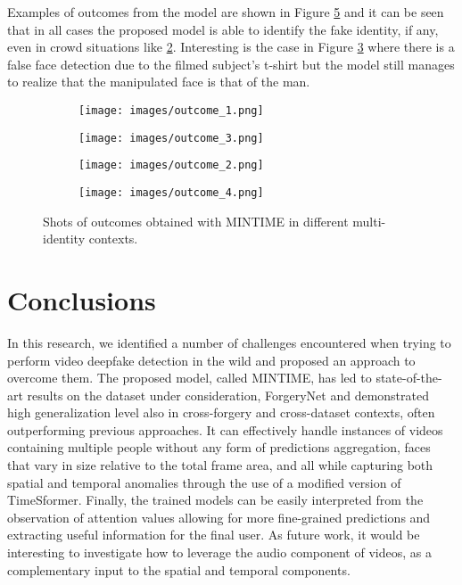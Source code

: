 \documentclass[10pt,twocolumn,letterpaper]{article}
\begin{document}
Examples of outcomes from the model are shown in Figure \ref{fig:outcome} and it can be seen that in all cases the proposed model is able to identify the fake identity, if any, even in crowd situations like \ref{fig:outcome_b}. Interesting is the case in Figure \ref{fig:outcome_c} where there is a false face detection due to the filmed subject's t-shirt but the model still manages to realize that the manipulated face is that of the man. 
\begin{figure}[t]
    \centering
    \begin{subfigure}{.45\linewidth}
    \texttt{[image: images/outcome\_1.png]}  \caption{}
    \label{fig:outcome_a}
    \end{subfigure}
    \begin{subfigure}{.45\linewidth}
    \texttt{[image: images/outcome\_3.png]}  \caption{}
    \label{fig:outcome_b}
    \end{subfigure}
    \begin{subfigure}{.45\linewidth}
    \texttt{[image: images/outcome\_2.png]}  \caption{}
    \label{fig:outcome_c}
    \end{subfigure}
    \begin{subfigure}{.45\linewidth}
    \texttt{[image: images/outcome\_4.png]}  \caption{}
    \label{fig:outcome_d}
    \end{subfigure}
    \caption{Shots of outcomes obtained with MINTIME in different multi-identity contexts.}
    \label{fig:outcome}
\end{figure}

\section{Conclusions}
In this research, we identified a number of challenges encountered when trying to perform video deepfake detection in the wild and proposed an approach to overcome them. The proposed model, called MINTIME, has led to state-of-the-art results on the dataset under consideration, ForgeryNet and demonstrated high generalization level also in cross-forgery and cross-dataset contexts, often outperforming previous approaches. It can effectively handle instances of videos containing multiple people without any form of predictions aggregation, faces that vary in size relative to the total frame area, and all while capturing both spatial and temporal anomalies through the use of a modified version of TimeSformer. Finally, the trained models can be easily interpreted from the observation of attention values allowing for more fine-grained predictions and extracting useful information for the final user. As future work, it would be interesting to investigate how to leverage the audio component of videos, as a complementary input to the spatial and temporal components.
\end{document}
